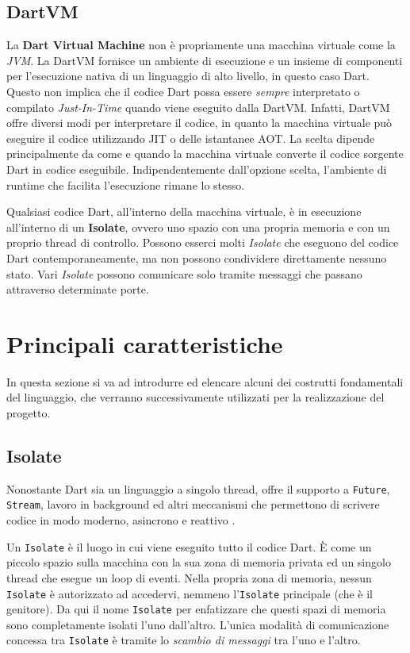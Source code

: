 \subsection{DartVM}
La \textbf{Dart Virtual Machine} non è propriamente una macchina virtuale come la \textit{JVM}. La DartVM fornisce un ambiente di esecuzione e un insieme di componenti per l'esecuzione nativa di un linguaggio di alto livello, in questo caso Dart. Questo non implica che il codice Dart possa essere \textit{sempre} interpretato o compilato \textit{Just-In-Time} quando viene eseguito dalla DartVM. Infatti, DartVM offre diversi modi per interpretare il codice, in quanto la macchina virtuale può eseguire il codice utilizzando JIT o delle istantanee AOT. La scelta dipende principalmente da come e quando la macchina virtuale converte il codice sorgente Dart in codice eseguibile. Indipendentemente dall'opzione scelta, l'ambiente di runtime che facilita l'esecuzione rimane lo stesso.

Qualsiasi codice Dart, all'interno della macchina virtuale, è in esecuzione all'interno di un \textbf{Isolate}, ovvero uno spazio con una propria memoria e con un proprio thread di controllo. Possono esserci molti \textit{Isolate} che eseguono del codice Dart contemporaneamente, ma non possono condividere direttamente nessuno stato. Vari \textit{Isolate} possono comunicare solo tramite messaggi che passano attraverso determinate porte.

\section{Principali caratteristiche}
In questa sezione si va ad introdurre ed elencare alcuni dei costrutti fondamentali del linguaggio, che verranno successivamente utilizzati per la realizzazione del progetto.

\subsection{Isolate}
Nonostante Dart sia un linguaggio a singolo thread, offre il supporto a \verb|Future|, \verb|Stream|, lavoro in background ed altri meccanismi che permettono di scrivere codice in modo moderno, asincrono e reattivo \cite{isolate_event_loop}.

Un \verb|Isolate| è il luogo in cui viene eseguito tutto il codice Dart. È come un piccolo spazio sulla macchina con la sua zona di memoria privata ed un singolo thread che esegue un loop di eventi. Nella propria zona di memoria, nessun \verb|Isolate| è autorizzato ad accedervi, nemmeno l'\verb|Isolate| principale (che è il genitore). Da qui il nome \verb|Isolate| per enfatizzare che questi spazi di memoria sono completamente isolati l'uno dall'altro. L'unica modalità di comunicazione concessa tra \verb|Isolate| è tramite lo \textit{scambio di messaggi} tra l'uno e l'altro.

